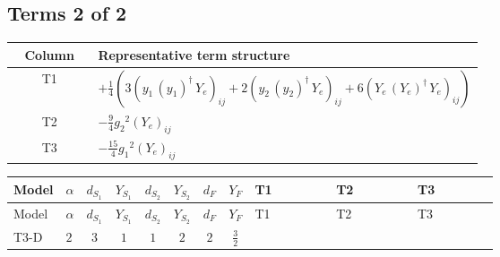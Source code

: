 \documentclass[8pt]{article}
\begin{document}
\begin{landscape}
\subsection*{Terms 2 of 2}
\begin{center}
\begin{tabular}{@{}c >{\raggedright\arraybackslash}p{0.82\linewidth}@{}}
\toprule
Column & Representative term structure \\
\midrule
T1 & \(\displaystyle +\frac{1}{4} (3 \left({y_1}\,\left({y_1}\right)^{\dagger}\,{Y_e}\right)_{ij}+2 \left({y_2}\,\left({y_2}\right)^{\dagger}\,{Y_e}\right)_{ij}+6 \left({Y_e}\,\left({Y_e}\right)^{\dagger}\,{Y_e}\right)_{ij})\) \\
\midrule
T2 & \(\displaystyle -\frac{9}{4} {g_2}^2 \left({Y_e}\right)_{ij}\) \\
\midrule
T3 & \(\displaystyle -\frac{15}{4} {g_1}^2 \left({Y_e}\right)_{ij}\) \\
\midrule
\bottomrule
\end{tabular}
\end{center}
\smallskip
\tiny
\begin{longtable}{@{}llcccccc >{\raggedright\arraybackslash}p{0.21\linewidth} >{\raggedright\arraybackslash}p{0.21\linewidth} >{\raggedright\arraybackslash}p{0.21\linewidth}@{}}
\toprule
Model & $\alpha$ & $d_{S_1}$ & $Y_{S_1}$ & $d_{S_2}$ & $Y_{S_2}$ & $d_F$ & $Y_F$ & T1 & T2 & T3 \\
\midrule
\endfirsthead
\toprule
Model & $\alpha$ & $d_{S_1}$ & $Y_{S_1}$ & $d_{S_2}$ & $Y_{S_2}$ & $d_F$ & $Y_F$ & T1 & T2 & T3 \\
\midrule
\endhead
T3-D & $2$ & $3$ & $1$ & $1$ & $2$ & $2$ & $\frac{3}{2}$ & \scriptsize\adjustbox{max width=\linewidth}{$\begin{gathered} +\frac{1}{4} (3 \left({y_1}\,\left({y_1}\right)^{\dagger}\,{Y_e}\right)_{ij}+2 \left({y_2}\,\left({y_2}\right)^{\dagger}\,{Y_e}\right)_{ij}+6 \left({Y_e}\,\left({Y_e}\right)^{\dagger}\,{Y_e}\right)_{ij})\end{gathered}$} & \scriptsize\adjustbox{max width=\linewidth}{$\begin{gathered} -\frac{9}{4} {g_2}^2 \left({Y_e}\right)_{ij}\end{gathered}$} & \scriptsize\adjustbox{max width=\linewidth}{$\begin{gathered} -\frac{15}{4} {g_1}^2 \left({Y_e}\right)_{ij}\end{gathered}$} \\
\midrule
\bottomrule
\end{longtable}
\clearpage

\end{landscape}
\end{document}
